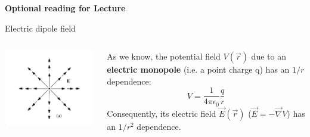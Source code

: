


%
%

\begin{frame}[plain,c]
\begin{center}
{\Huge \bf Optional reading for Lecture \thislecture}
\end{center}
\end{frame}


%
%
%

\begin{frame}{Electric dipole field}

\begin{columns}
  \begin{column}{0.20\textwidth}
   \begin{center}
     \includegraphics[width=0.99\textwidth]{./images/schematics/electric_field_pos_point_charge.png}\\
   \end{center}
  \end{column}
  \begin{column}{0.80\textwidth}
     As we know, the potential field $V(\vec{r})$ due to an
     {\bf electric monopole} (i.e. a point charge q) has an $1/r$ dependence:
     \begin{equation*}
         V = \frac{1}{4\pi\epsilon_0} \frac{q}{r}
     \end{equation*}
     Consequently, its electric field $\vec{E}(\vec{r})$ ($\vec{E} = -\vec{\nabla}V$)
     has an $1/r^2$ dependence.
  \end{column}
\end{columns}


\end{frame}

